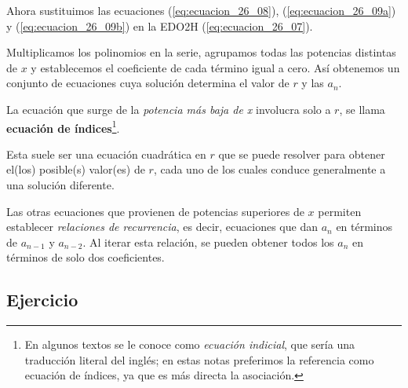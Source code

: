 Ahora sustituimos las ecuaciones (\ref{eq:ecuacion_26_08}), (\ref{eq:ecuacion_26_09a}) y (\ref{eq:ecuacion_26_09b}) en la EDO2H (\ref{eq:ecuacion_26_07}).
\par
Multiplicamos los polinomios en la serie, agrupamos todas las potencias distintas de $x$ y establecemos el coeficiente de cada término igual a cero. Así obtenemos un conjunto de ecuaciones cuya solución determina el valor de $r$ y las $a_{n}$.
\par
La ecuación que surge de la \emph{potencia más baja de x} involucra solo a $r$, se llama \textbf{ecuación de índices}\footnote{En algunos textos se le conoce como \emph{ecuación indicial}, que sería una traducción literal del inglés; en estas notas preferimos la referencia como ecuación de índices, ya que es más directa la asociación.}.
\par
Esta suele ser una ecuación cuadrática en $r$ que se puede resolver para obtener el(los) posible(s) valor(es) de $r$, cada uno de los cuales conduce generalmente a una solución diferente.
\par
Las otras ecuaciones que provienen de potencias superiores de $x$ permiten establecer \emph{relaciones de recurrencia}, es decir, ecuaciones que dan $a_{n}$ en términos de $a_{n-1}$ y $a_{n-2}$. Al iterar esta relación, se pueden obtener todos los $a_{n}$ en términos de solo dos coeficientes.

\subsection{Ejercicio}

